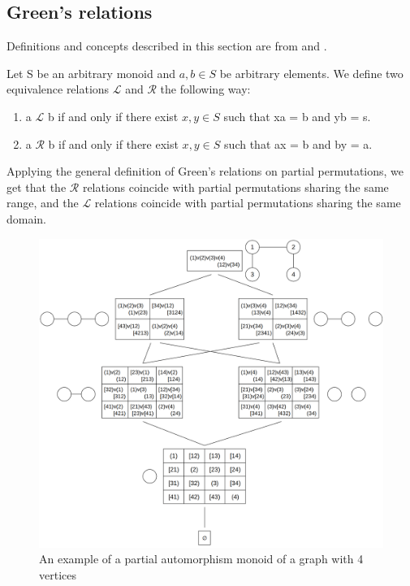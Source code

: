 \subsection{Green's relations}

Definitions and concepts described in this section are from \cite[Section~3.3]{jjss21} and \cite[Section~3]{jaj22}.

\begin{definition}
\label{green_rel_def}
Let S be an arbitrary monoid and $a, b \in S$ be arbitrary elements. We define two equivalence relations $\mathcal{L}$ and $\mathcal{R}$ the following way:
\begin{enumerate}
\item a $\mathcal{L}$ b if and only if there exist $x, y \in S$ such that xa = b and yb = s.
\item a $\mathcal{R}$ b if and only if there exist $x, y \in S$ such that ax = b and by = a.
\end{enumerate}
\end{definition}

Applying the general definition of Green's relations on partial permutations, we get that the $\mathcal{R}$ relations coincide with partial permutations sharing the same range, and the $\mathcal{L}$ relations coincide with partial permutations sharing the same domain.

\begin{figure}[H]
\includegraphics[width=\textwidth,height=\textheight,keepaspectratio]{images/partial_sym_example.png}
\caption{An example of a partial automorphism monoid of a graph with 4 vertices}
\label{fig:partial_sym_example}
\end{figure}

